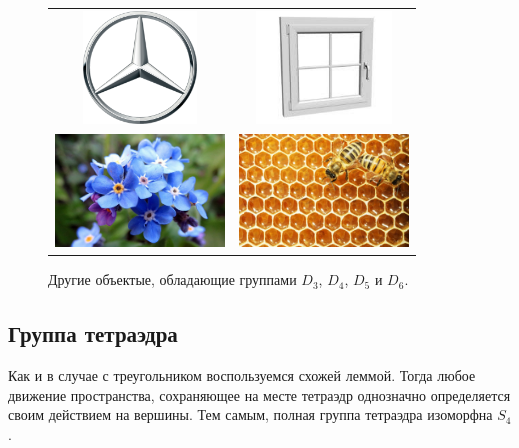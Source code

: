\begin{figure}[ht]
    \centering
    \begin{tabular}{c c}
        \includegraphics[height=3cm]{images/Mercedes-Logo.png} & 
        \includegraphics[height=3cm]{images/window.jpg} \\
        \includegraphics[height=3cm]{images/nezabudka_1.jpg} & 
        \includegraphics[height=3cm]{images/38018.pkfy9c.840.jpg}
    \end{tabular}
    \caption{Другие объектые, обладающие группами $D_3$, $D_4$, $D_5$ и $D_6$.}
\end{figure}

\subsection{Группа тетраэдра}

Как и в случае с треугольником воспользуемся схожей леммой. Тогда любое движение пространства, сохраняющее на месте тетраэдр однозначно определяется своим действием на вершины. Тем самым, полная группа тетраэдра изоморфна $S_4$.

